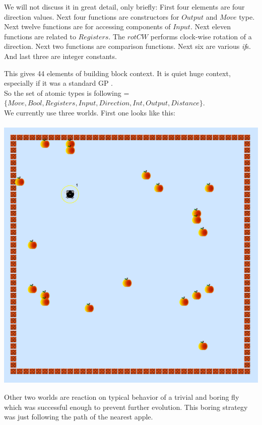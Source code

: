 \documentclass[12pt,a4paper]{report}
\begin{document}
\newpage
We will not discuss it in great detail, only briefly: First four 
elements are four direction values. Next four functions are
constructors for $Output$ and $Move$ type. Next twelve functions
are for accessing components of $Input$. Next eleven functions are 
related to $Registers$. The $rotCW$ performs clock-wise rotation of a direction.
Next two functions are comparison functions. Next six are various \textit{if}s. And last 
three are integer constants. 

This gives 44 elements of building block context. It is quiet huge 
context, especially if it was a standard GP \TuF.\\

So the set of atomic types is following =\\
$\{Move, Bool, Registers, Input,
Direction, Int, Output, Distance\}$.\\


We currently use three worlds.
First one looks like this:\\

~\\[2em]

\includegraphics[scale=0.8]{fly/1.png}


Other two worlds are reaction on typical behavior 
of a trivial and boring fly which was successful
enough to prevent further evolution.
This boring strategy was just following the path 
of the nearest apple. 
\end{document}
